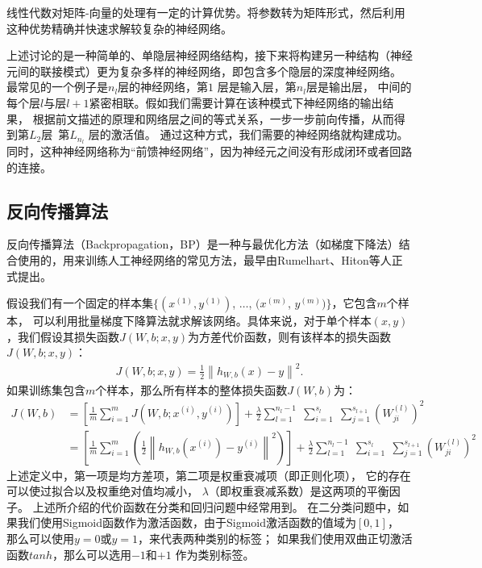 线性代数对矩阵-向量的处理有一定的计算优势。将参数转为矩阵形式，然后利用这种优势精确并快速求解较复杂的神经网络。\par

上述讨论的是一种简单的、单隐层神经网络结构，接下来将构建另一种结构（神经元间的联接模式）更为复杂多样的神经网络，即包含多个隐层的深度神经网络。
最常见的一个例子是$n_l$层的神经网络，第$1$ 层是输入层，第$n_l$层是输出层，
中间的每个层$l$与层$l+1$紧密相联。假如我们需要计算在该种模式下神经网络的输出结果，
根据前文描述的原理和网络层之间的等式关系，一步一步前向传播，从而得到第$L_2$层~第$L_{n_l}$ 层的激活值。
通过这种方式，我们需要的神经网络就构建成功。
同时，这种神经网络称为“前馈神经网络”，因为神经元之间没有形成闭环或者回路的连接。\par

\subsection{反向传播算法}
反向传播算法（Backpropagation，BP）是一种与最优化方法（如梯度下降法）结合使用的，用来训练人工神经网络的常见方法，最早由Rumelhart、Hiton等人正式提出\cite{rumelhart1986learning}。\par

假设我们有一个固定的样本集$\{ (x^{(1)}, y^{(1)})$, $\ldots$, $(x^{(m)}$, $y^{(m)}) \}$，它包含$m$个样本，
可以利用批量梯度下降算法就求解该网络。具体来说，对于单个样本$(x,y)$，我们假设其损失函数$J(W,b; x,y)$为方差代价函数，则有该样本的损失函数$J(W,b; x,y)$：
\begin{align}
	J(W,b; x,y) = \frac{1}{2} \left\| h_{W,b}(x) - y \right\|^2.
\end{align}
如果训练集包含$m$个样本，那么所有样本的整体损失函数$J(W,b)$为：
\begin{equation}
	\begin{aligned}
	J(W,b)
	&= \left[ \frac{1}{m} \sum_{i=1}^m J(W,b;x^{(i)},y^{(i)}) \right]
	+ \frac{\lambda}{2} \sum_{l=1}^{n_l-1} \; \sum_{i=1}^{s_l} \; \sum_{j=1}^{s_{l+1}} \left( W^{(l)}_{ji} \right)^2
	\\
	&= \left[ \frac{1}{m} \sum_{i=1}^m \left( \frac{1}{2} \left\| h_{W,b}(x^{(i)}) - y^{(i)} \right\|^2 \right) \right]
	+ \frac{\lambda}{2} \sum_{l=1}^{n_l-1} \; \sum_{i=1}^{s_l} \; \sum_{j=1}^{s_{l+1}} \left( W^{(l)}_{ji} \right)^2
	\end{aligned}
\end{equation}
上述定义中，第一项是均方差项，第二项是权重衰减项（即正则化项），
它的存在可以使过拟合以及权重绝对值均减小，
$\lambda$（即权重衰减系数）是这两项的平衡因子。
上述所介绍的代价函数在分类和回归问题中经常用到。
在二分类问题中，如果我们使用Sigmoid函数作为激活函数，由于Sigmoid激活函数的值域为$[0,1]$，
那么可以使用$y=0$或$y=1$，来代表两种类别的标签；
如果我们使用双曲正切激活函数$tanh$，那么可以选用$-1$和$+1$ 作为类别标签。\par


